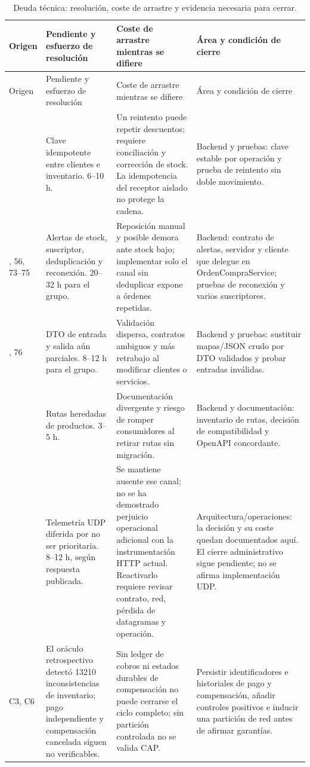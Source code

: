 \documentclass[12pt,a4paper]{article}
\begin{document}
{\footnotesize\setlength{\tabcolsep}{4pt}
\begin{longtable}{>{\raggedright\arraybackslash}p{1.7cm}>{\raggedright\arraybackslash}p{3.6cm}>{\raggedright\arraybackslash}p{4.8cm}>{\raggedright\arraybackslash}p{4.3cm}}
\caption{Deuda técnica: resolución, coste de arrastre y evidencia necesaria para cerrar.}\label{tab:deuda}\\
\toprule Origen & Pendiente y esfuerzo de resolución & Coste de arrastre mientras se difiere & Área y condición de cierre\\\midrule\endfirsthead
\toprule Origen & Pendiente y esfuerzo de resolución & Coste de arrastre mientras se difiere & Área y condición de cierre\\\midrule\endhead
43 & Clave idempotente entre clientes e inventario. 6--10 h. & Un reintento puede repetir descuentos; requiere conciliación y corrección de stock. La idempotencia del receptor aislado no protege la cadena. & Backend y pruebas: clave estable por operación y prueba de reintento sin doble movimiento.\\
53, 56, 73--75 & Alertas de stock, suscriptor, deduplicación y reconexión. 20--32 h para el grupo. & Reposición manual y posible demora ante stock bajo; implementar solo el canal sin deduplicar expone a órdenes repetidas. & Backend: contrato de alertas, servidor y cliente que delegue en OrdenCompraService; pruebas de reconexión y varios suscriptores.\\
64, 76 & DTO de entrada y salida aún parciales. 8--12 h para el grupo. & Validación dispersa, contratos ambiguos y más retrabajo al modificar clientes o servicios. & Backend y pruebas: sustituir mapas/JSON crudo por DTO validados y probar entradas inválidas.\\
77 & Rutas heredadas de productos. 3--5 h. & Documentación divergente y riesgo de romper consumidores al retirar rutas sin migración. & Backend y documentación: inventario de rutas, decisión de compatibilidad y OpenAPI concordante.\\
78 & Telemetría UDP diferida por no ser prioritaria. 8--12 h, según respuesta publicada. & Se mantiene ausente ese canal; no se ha demostrado perjuicio operacional adicional con la instrumentación HTTP actual. Reactivarlo requiere revisar contrato, red, pérdida de datagramas y operación. & Arquitectura/operaciones: la decisión y su coste quedan documentados aquí. El cierre administrativo sigue pendiente; no se afirma implementación UDP.\\
C3, C6 & El oráculo retrospectivo detectó 13210 inconsistencias de inventario; pago independiente y compensación cancelada siguen no verificables. & Sin ledger de cobros ni estados durables de compensación no puede cerrarse el ciclo completo; sin partición controlada no se valida CAP. & Persistir identificadores e historiales de pago y compensación, añadir controles positivos e inducir una partición de red antes de afirmar garantías.\\

\end{longtable}}
\end{document}
